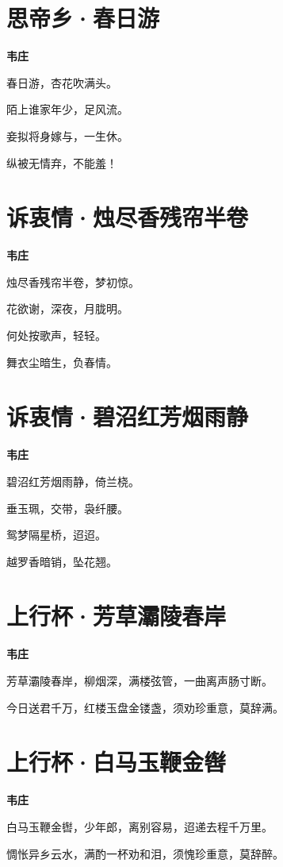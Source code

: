 \documentclass[12pt,a4paper]{ctexbook}
\begin{document}
\section{思帝乡·春日游}
\textbf{韦庄}\par\vspace{0.5em}
春日游，杏花吹满头。\par
陌上谁家年少，足风流。\par
妾拟将身嫁与，一生休。\par
纵被无情弃，不能羞！\par

\section{诉衷情·烛尽香残帘半卷}
\textbf{韦庄}\par\vspace{0.5em}
烛尽香残帘半卷，梦初惊。\par
花欲谢，深夜，月胧明。\par
何处按歌声，轻轻。\par
舞衣尘暗生，负春情。\par

\section{诉衷情·碧沼红芳烟雨静}
\textbf{韦庄}\par\vspace{0.5em}
碧沼红芳烟雨静，倚兰桡。\par
垂玉珮，交带，袅纤腰。\par
鸳梦隔星桥，迢迢。\par
越罗香暗销，坠花翘。\par

\section{上行杯·芳草灞陵春岸}
\textbf{韦庄}\par\vspace{0.5em}
芳草灞陵春岸，柳烟深，满楼弦管，一曲离声肠寸断。\par
今日送君千万，红楼玉盘金镂盏，须劝珍重意，莫辞满。\par

\section{上行杯·白马玉鞭金辔}
\textbf{韦庄}\par\vspace{0.5em}
白马玉鞭金辔，少年郎，离别容易，迢递去程千万里。\par
惆怅异乡云水，满酌一杯劝和泪，须愧珍重意，莫辞醉。\par
\end{document}
